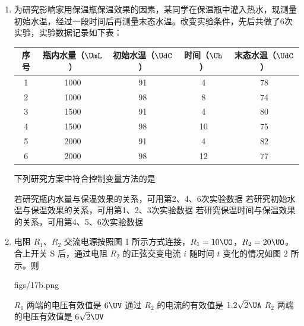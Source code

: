 \documentclass[\gkver]{gaokaozhenti}
\begin{document}
\begin{enumerate}
\item
为研究影响家用保温瓶保温效果的因素，某同学在保温瓶中灌入热水，现测量初始水温，经过一段时间后再测量末态水温。改变实验条件，先后共做了6次实验，实验数据记录如下表：

\begin{center}
\begin{tabular}{|c|c|c|c|c|}
\hline
序号 & 瓶内水量（$\UmL$） & 初始水温（$\UdC$） & 时间（$\Uh$） & 末态水温（$\UdC$）\\
\hline
1 & 1000 & 91 & 4 & 78\\
\hline
2 & 1000 & 98 & 8 & 74\\
\hline
3 & 1500 & 91 & 4 & 80\\
\hline
4 & 1500 & 98 & 10 & 75\\
\hline
5 & 2000 & 91 & 4 & 82\\
\hline
6 & 2000 & 98 & 12 & 77\\
\hline
\end{tabular}
\end{center}

下列研究方案中符合控制变量方法的是

{若研究瓶内水量与保温效果的关系，可用第2、4、6次实验数据}
{若研究初始水温与保温效果的关系，可用第1、2、3次实验数据}
{若研究保温时间与保温效果的关系，可用第4、5、6次实验数据}


\item
电阻 $R_{1}$、$R_{2}$ 交流电源按照图 1 所示方式连接，$R_{1}=10\UO$，$R_{2}=20\UO$。合上开关 S 后，通过电阻 $R_{2}$ 的正弦交变电流 $i$ 随时间 $t$ 变化的情况如图 2 所示。则

{figs/17b.png}

{$R_{1}$ 两端的电压有效值是 $6\UV$}
{通过 $R_{2}$ 的电流的有效值是 $1.2\sqrt{2}\UA$}
{$R_{2}$ 两端的电压有效值是 $6\sqrt{2}\UV$}


\end{enumerate}
\end{document}
